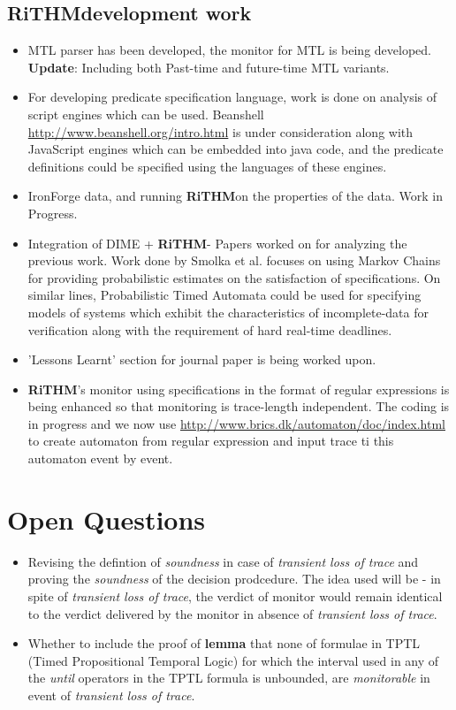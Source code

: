 \documentclass[]{article}
\newcommand{\rithm}{\textbf{RiTHM}\space}
\newcommand{\tloss}{\emph{transient loss of trace}}
\begin{document}
	\subsection{\rithm development work}
	\begin{itemize}
	\item MTL parser has been developed, the monitor for MTL is being developed. \textbf{Update}: Including both Past-time and future-time MTL variants. 
	\item For developing predicate specification language, work is done on analysis of script engines which can be used. Beanshell \url{http://www.beanshell.org/intro.html} is under consideration along with JavaScript engines which can be embedded into java code, and the predicate definitions could be specified using the languages of these engines.
	
	\item IronForge data, and running \rithm on the properties of the data. Work in Progress.
	
	\item Integration of DIME + \rithm - Papers worked on for analyzing the previous work. Work done by Smolka et al. focuses on using Markov Chains for providing probabilistic estimates on the satisfaction of specifications. On similar lines, Probabilistic Timed Automata could be used for specifying 
	models of systems which exhibit the characteristics of incomplete-data for verification along with the requirement of hard real-time deadlines.
	\item 'Lessons Learnt' section for journal paper is being worked upon.
	
	\item \rithm's monitor using specifications in the format of regular expressions is being enhanced so that monitoring is trace-length independent. The coding is in progress and we now use \url{http://www.brics.dk/automaton/doc/index.html} to create automaton from regular expression and input trace ti this automaton event by event. 
	

	\end{itemize}

\section{Open Questions}
	\begin{itemize}
	\item Revising the defintion of \emph{soundness} in case of \tloss{} and proving the \emph{soundness} of the decision prodcedure. The idea used will be  - in spite of \tloss{}, the verdict of monitor would remain identical to the verdict delivered by the monitor in absence of \tloss{}.  
	
	\item Whether to include the proof of \textbf{lemma} that none of formulae in TPTL (Timed Propositional Temporal Logic) for which the interval used in any of the \emph{until} operators in the TPTL formula is unbounded, are \emph{monitorable} in event of \tloss. 	 
	\end{itemize}
\end{document}
